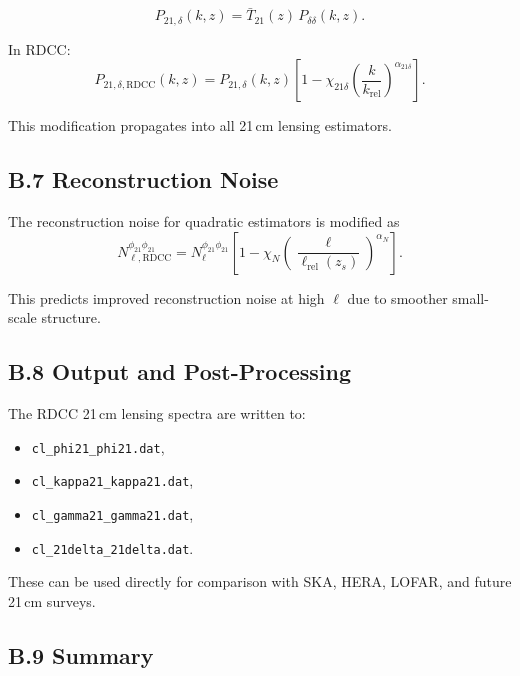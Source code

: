 \documentclass[11pt,a4paper]{article}
\begin{document}
\[
P_{21,\delta}(k,z) = \bar{T}_{21}(z)\,P_{\delta\delta}(k,z).
\]



In RDCC:
\begin{equation}
P_{21,\delta,\mathrm{RDCC}}(k,z)
=
P_{21,\delta}(k,z)
\left[
1
-
\chi_{21\delta}
\left(
\frac{k}{k_{\mathrm{rel}}}
\right)^{\alpha_{21\delta}}
\right].
\end{equation}

This modification propagates into all 21\,cm lensing estimators.

\subsection*{B.7 Reconstruction Noise}

The reconstruction noise for quadratic estimators is modified as
\begin{equation}
N_{\ell,\mathrm{RDCC}}^{\phi_{21}\phi_{21}}
=
N_{\ell}^{\phi_{21}\phi_{21}}
\left[
1
-
\chi_{N}
\left(
\frac{\ell}{\ell_{\mathrm{rel}}(z_{s})}
\right)^{\alpha_{N}}
\right].
\end{equation}

This predicts improved reconstruction noise at high $\ell$ due to smoother small-scale structure.

\subsection*{B.8 Output and Post-Processing}

The RDCC 21\,cm lensing spectra are written to:

\begin{itemize}
\item \texttt{cl\_phi21\_phi21.dat},
\item \texttt{cl\_kappa21\_kappa21.dat},
\item \texttt{cl\_gamma21\_gamma21.dat},
\item \texttt{cl\_21delta\_21delta.dat}.
\end{itemize}

These can be used directly for comparison with SKA, HERA, LOFAR, and future 21\,cm surveys.

\subsection*{B.9 Summary}
\end{document}
